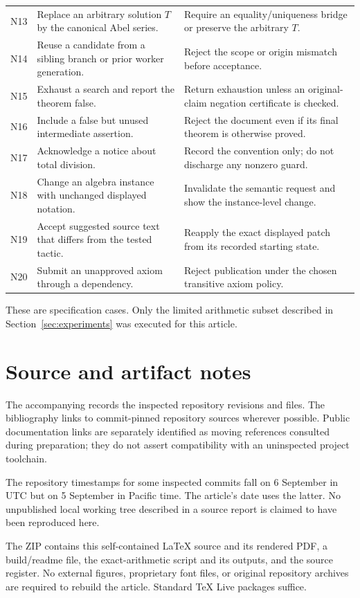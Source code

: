 \documentclass[11pt,a4paper]{article}
\newcommand{\code}[1]{\texttt{\detokenize{#1}}}
\theoremstyle{definition}
\theoremstyle{remark}
\begin{document}
\begin{longtable}{@{}P{.06\textwidth}P{.43\textwidth}P{.43\textwidth}@{}}
N13 & Replace an arbitrary solution $T$ by the canonical Abel series. & Require an equality/uniqueness bridge or preserve the arbitrary $T$.\\
N14 & Reuse a candidate from a sibling branch or prior worker generation. & Reject the scope or origin mismatch before acceptance.\\
N15 & Exhaust a search and report the theorem false. & Return exhaustion unless an original-claim negation certificate is checked.\\
N16 & Include a false but unused intermediate assertion. & Reject the document even if its final theorem is otherwise proved.\\
N17 & Acknowledge a notice about total division. & Record the convention only; do not discharge any nonzero guard.\\
N18 & Change an algebra instance with unchanged displayed notation. & Invalidate the semantic request and show the instance-level change.\\
N19 & Accept suggested source text that differs from the tested tactic. & Reapply the exact displayed patch from its recorded starting state.\\
N20 & Submit an unapproved axiom through a dependency. & Reject publication under the chosen transitive axiom policy.\\
\bottomrule
\end{longtable}
These are specification cases. Only the limited arithmetic subset described in Section~\ref{sec:experiments} was executed for this article.

\section{Source and artifact notes}\label{app:source}
The accompanying \code{evidence/source-register.json} records the inspected repository revisions and files. The bibliography links to commit-pinned repository sources wherever possible. Public documentation links are separately identified as moving references consulted during preparation; they do not assert compatibility with an uninspected project toolchain.

The repository timestamps for some inspected commits fall on 6 September in UTC but on 5 September in Pacific time. The article's date uses the latter. No unpublished local working tree described in a source report is claimed to have been reproduced here.

The ZIP contains this self-contained \LaTeX{} source and its rendered PDF, a build/readme file, the exact-arithmetic script and its outputs, and the source register. No external figures, proprietary font files, or original repository archives are required to rebuild the article. Standard \TeX{} Live packages suffice.
\end{document}
